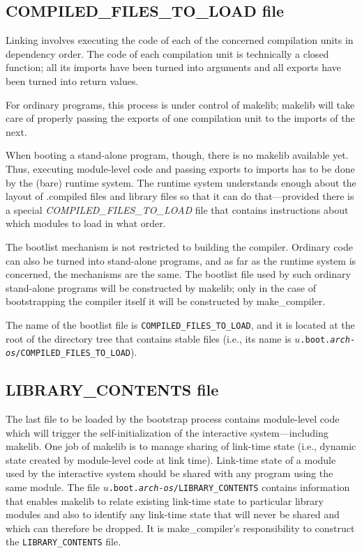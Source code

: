 \subsection{COMPILED_FILES_TO_LOAD file}

Linking involves executing the code of each of the
concerned compilation units in dependency order.  The code of each compilation unit is
technically a closed function; all its imports have been turned into
arguments and all exports have been turned into return values.

For ordinary programs, this process is under control of makelib; makelib will
take care of properly passing the exports of one compilation unit to
the imports of the next.

When booting a stand-alone program, though, there is no makelib available
yet.  Thus, executing module-level code and passing exports to imports
has to be done by the (bare) runtime system.  The runtime system
understands enough about the layout of .compiled files and library files so
that it can do that---provided there is a special {\em COMPILED_FILES_TO_LOAD}
file that contains instructions about which modules to load in what
order.

The bootlist mechanism is not restricted to building the compiler.  Ordinary
code can also be turned into stand-alone programs, and as far as the
runtime system is concerned, the mechanisms are the same.  The
bootlist file used by such ordinary stand-alone programs will be
constructed by makelib; only in the case of bootstrapping the compiler itself it
will be constructed by make_compiler.

The name of the bootlist file is {\tt COMPILED_FILES_TO_LOAD}, and it is located at
the root of the directory tree that contains stable files (i.e., its
name is {\tt $u$.boot{.\it arch}-{\it os}/COMPILED_FILES_TO_LOAD}).

\subsection{LIBRARY_CONTENTS file}

The last file to be loaded by the bootstrap process contains
module-level code which will trigger the self-initialization of the
interactive system---including makelib.  One job of makelib is to manage sharing
of link-time state (i.e., dynamic state created by module-level code
at link time).  Link-time state of a module used by the interactive
system should be shared with any program using the same module.  The
file {\tt $u$.boot{.\it arch}-{\it os}/LIBRARY_CONTENTS} contains information
that enables makelib to relate existing link-time state to particular
library modules and also to identify any link-time state that will
never be shared and which can therefore be dropped.  It is make_compiler's
responsibility to construct the {\tt LIBRARY_CONTENTS} file.

